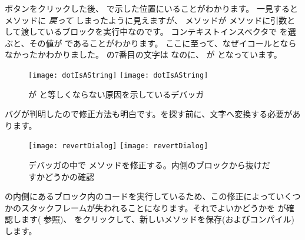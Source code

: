 \documentclass[a4paper,10pt,twoside]{book}
\begin{document}
 ボタンをクリックした後、 で示した位置にいることがわかります。
一見すると  メソッドに \emph{戻って} しまったように見えますが、 メソッドが  メソッドに引数として渡しているブロックを実行中なのです。
コンテキストインスペクタで  を選ぶと、その値が  であることがわかります。
ここに至って、なぜイコールとならなかったかわかりました。 の7番目の文字は  なのに、 が  となっています。

\begin{figure}[btp]
\begin{center}
\ifluluelse
{\texttt{[image: dotIsAString]}}
{\texttt{[image: dotIsAString]}}
\end{center}
\caption{ が  と等しくならない原因を示しているデバッガ}
\end{figure}

バグが判明したので修正方法も明白です。を探す前に、文字へ変換する必要があります。

\begin{figure}[btp]
\begin{center}
\ifluluelse
{\texttt{[image: revertDialog]}}
{\texttt{[image: revertDialog]}}
\end{center}
\caption{デバッガの中で  メソッドを修正する。内側のブロックから抜けだすかどうかの確認}
\end{figure}


 の内側にあるブロック内のコードを実行しているため、この修正によっていくつかのスタックフレームが失われることになります。それでよいかどうかを \pharo が確認します(  参照)、 をクリックして、新しいメソッドを保存(およびコンパイル)します。

\end{document}
